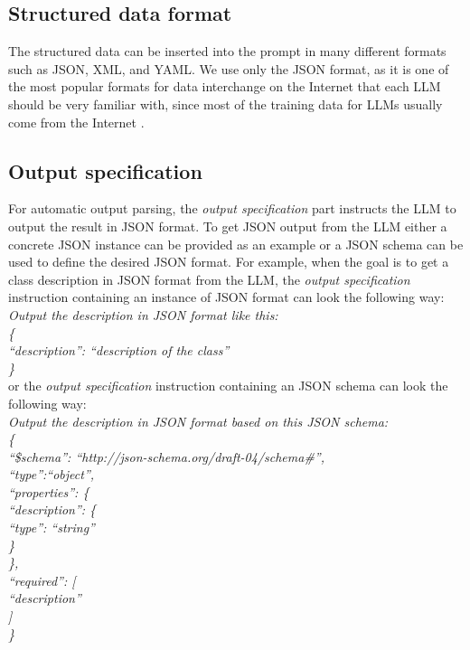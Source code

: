 \subsection{Structured data format}

The structured data can be inserted into the prompt in many different formats such as JSON, XML, and YAML. We use only the JSON format, as it is one of the most popular formats for data interchange on the Internet that each LLM should be very familiar with, since most of the training data for LLMs usually come from the Internet \cite{Zhao2023}.


\subsection{Output specification}

For automatic output parsing, the \emph{output specification} part instructs the LLM to output the result in JSON format. To get JSON output from the LLM either a concrete JSON instance can be provided as an example or a JSON schema can be used to define the desired JSON format. For example, when the goal is to get a class description in JSON format from the LLM, the \emph{output specification} instruction containing an instance of JSON format can look the following way: \\

\noindent{}\textit{Output the description in JSON format like this: \\
\{ \\
\null \quad ``description'': ``description of the class'' \\
\}} \\

\noindent{}or the \emph{output specification} instruction containing an JSON schema can look the following way: \\

\noindent{}\textit{Output the description in JSON format based on this JSON schema: \\
\{ \\
\null \quad ``\$schema'': ``http://json-schema.org/draft-04/schema\#'', \\
\null \quad  ``type'':``object'', \\
\null \quad  ``properties'': \{ \\
\null \quad \quad ``description'': \{ \\
\null \quad \quad \quad ``type'': ``string'' \\
\null \quad \quad   \} \\
\null \quad  \}, \\
\null \quad  ``required'': [ \\
\null \quad \quad   ``description'' \\
\null \quad  ] \\
\}} \\



